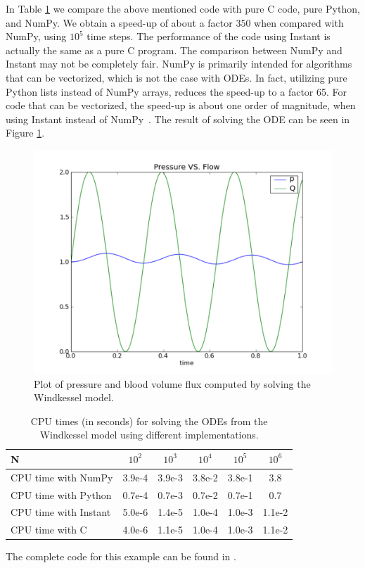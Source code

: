 In Table \ref{wilbers:fig:speed-up} we compare the above mentioned
code with pure C code, pure Python, and NumPy.  We obtain a speed-up
of about a factor $350$ when compared with NumPy, using $10^5$ time
steps. The performance of the code using Instant is actually the same
as a pure C program.  The comparison between NumPy and Instant may not
be completely fair. NumPy is primarily intended for algorithms that
can be vectorized, which is not the case with ODEs. In fact, utilizing
pure Python lists instead of NumPy arrays, reduces the speed-up to a
factor 65. For code that can be vectorized, the speed-up is about one
order of magnitude, when using Instant instead of
NumPy~\citep{WilbersLangtangenOdegaard2009}. The result of solving the
ODE can be seen in Figure
\ref{wilbers:fig:fig1}.

\begin{figure}
  \centering
  \includegraphics[width=\largefig]{chapters/wilbers/pdf/pressure_plot.pdf}
  \caption{Plot of pressure and blood volume flux computed by solving the Windkessel model.}
  \label{wilbers:fig:fig1}
\end{figure}

\begin{table}
  \centering
  \begin{tabular}{|l|c|c|c|c|c|} \hline
    N                     & $10^2$     & $10^3$ & $10^4$ &  $10^5$ &  $10^6$ \\ \hline
    CPU time with NumPy   & 3.9e-4  & 3.9e-3 & 3.8e-2 & 3.8e-1 & 3.8     \\ \hline
    CPU time with Python  & 0.7e-4  & 0.7e-3 & 0.7e-2 & 0.7e-1 & 0.7     \\ \hline
    CPU time with Instant & 5.0e-6  & 1.4e-5 & 1.0e-4 & 1.0e-3 & 1.1e-2  \\ \hline
    CPU time with C       & 4.0e-6  & 1.1e-5 & 1.0e-4 & 1.0e-3 & 1.1e-2  \\ \hline
  \end{tabular}
  \caption{CPU times (in seconds) for solving the ODEs from the  Windkessel model using different implementations.}
  \label{wilbers:fig:speed-up}
\end{table}
The complete code for this example can be found in .

